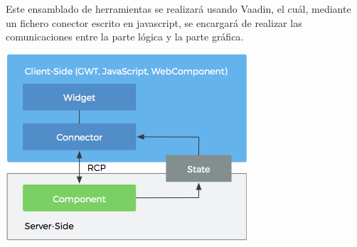 \documentclass[a4paper,12pt]{article}
\begin{document}
	
	Este ensamblado de herramientas se realizará usando Vaadin, el cuál, mediante un fichero conector escrito en javascript, se encargará de realizar las comunicaciones entre la parte lógica y la parte gráfica.\\
	
	
	\begin{center}
		\includegraphics{images/schema}\\
	\end{center}
	

	
\end{document}
